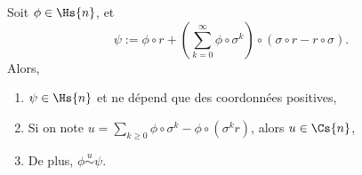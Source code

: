   \begin{lemma}
    \label{lem:fn_equiv_pos_coords}
    \leanok
    Soit $\phi \in \Hs{n}$, et
    $$\psi := \phi \circ r + \left(\sum_{k=0}^{\infty}{\phi \circ \sigma^k}\right)\circ(\sigma \circ r - r \circ \sigma).$$
    Alors,
    \begin{enumerate}
      \item $\psi \in \Hs{n}$ et ne dépend que des coordonnées positives,
      \item Si on note $u = \sum_{k\geq 0}{\phi\circ\sigma^k - \phi\circ(\sigma^k r)}$, alors $u \in \Cs{n}$,
      \item De plus, $\phi \overset{u}{\sim} \psi$.
    \end{enumerate}
  \end{lemma}

